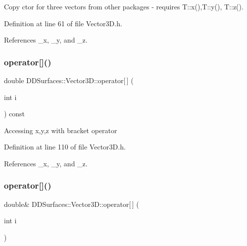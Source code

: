 Copy c\textquotesingle{}tor for three vectors from other packages -\/ requires T\+::x(),T\+::y(), T\+::z(). 

Definition at line 61 of file Vector3\+D.\+h.



References \+\_\+x, \+\_\+y, and \+\_\+z.

\hypertarget{class_d_d_surfaces_1_1_vector3_d_af72e511ff37ee15355eae8a73f40424e}{}\label{class_d_d_surfaces_1_1_vector3_d_af72e511ff37ee15355eae8a73f40424e} 
\subsubsection{\texorpdfstring{operator[]()}{operator[]()}\hspace{0.1cm}{\footnotesize\ttfamily [1/2]}}
{\footnotesize\ttfamily double D\+D\+Surfaces\+::\+Vector3\+D\+::operator\mbox{[}$\,$\mbox{]} (\begin{DoxyParamCaption}\item[{int}]{i }\end{DoxyParamCaption}) const\hspace{0.3cm}{\ttfamily [inline]}}

Accessing x,y,z with bracket operator 

Definition at line 110 of file Vector3\+D.\+h.



References \+\_\+x, \+\_\+y, and \+\_\+z.

\hypertarget{class_d_d_surfaces_1_1_vector3_d_ae4e1eca62cf8f1cae89ab8b8e2f2f132}{}\label{class_d_d_surfaces_1_1_vector3_d_ae4e1eca62cf8f1cae89ab8b8e2f2f132} 
\subsubsection{\texorpdfstring{operator[]()}{operator[]()}\hspace{0.1cm}{\footnotesize\ttfamily [2/2]}}
{\footnotesize\ttfamily double\& D\+D\+Surfaces\+::\+Vector3\+D\+::operator\mbox{[}$\,$\mbox{]} (\begin{DoxyParamCaption}\item[{int}]{i }\end{DoxyParamCaption})\hspace{0.3cm}{\ttfamily [inline]}}

